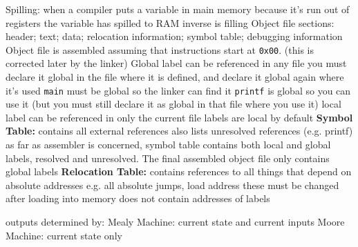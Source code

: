 \documentclass[12pt]{article}
\begin{document}
\begin{spacing}{0.8}
\begin{multicols*}{2}
\begin{flushleft}
\begin{outline}[longenum]
  \1 Spilling: when a compiler puts a variable in main memory because it's run out of registers
    \2 the variable has spilled to RAM
    \2 inverse is filling
  \1 Object file sections: header; text; data; relocation information; symbol table; debugging information
    \2 Object file is assembled assuming that instructions start at \verb|0x00|. (this is corrected later by the linker)
  \1 Global label can be referenced in any file
    \2 you must declare it global in the file where it is defined, and declare it global again where it's used
    \2 \verb|main| must be global so the linker can find it
    \2 \verb|printf| is global so you can use it (but you must still declare it as global in that file where you use it)
  \1 local label can be referenced in only the current file
    \2 labels are local by default
  \1 \textbf{Symbol Table:} contains all external references
    \2 also lists unresolved references (e.g. printf)
    \2 as far as assembler is concerned, symbol table contains both local and global labels, resolved and unresolved.
    \2 The final assembled object file only contains global labels
  \1 \textbf{Relocation Table:} contains references to all things that depend on absolute addresses
    \2 e.g. all absolute jumps, load address
    \2 these must be changed after loading into memory
    \2 does not contain addresses of labels




  \1 outputs determined by:
  \1 Mealy Machine: current state and current inputs
  \1 Moore Machine: current state only


\end{outline}
\end{flushleft}
\end{multicols*}
\end{spacing}
\end{document}
